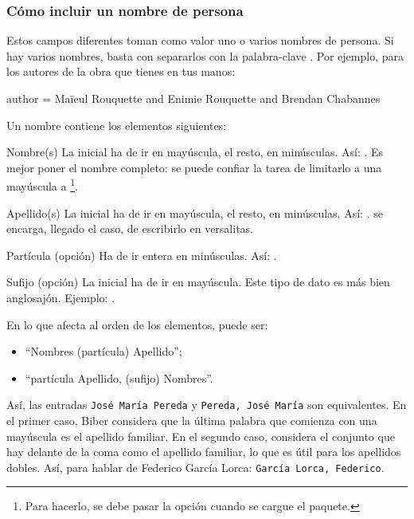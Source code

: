 \subsubsection{Cómo incluir un nombre de persona}

Estos campos diferentes toman como valor uno o varios nombres de
persona. Si hay varios nombres, basta con separarlos con la
palabra-clave . Por ejemplo, para los autores de la obra
que tienes en tus manos:

\begin{latexcode}
author = {Maïeul Rouquette and Enimie Rouquette and Brendan Chabannes}
\end{latexcode}

Un nombre contiene los elementos siguientes:
\begin{choix}
	\item[Nombre(s)]La inicial ha de ir en mayúscula, el resto, en
          minúsculas. Así: . Es mejor poner el nombre
          completo: se puede confiar la tarea de limitarlo a una
          mayúscula a \footnote{Para hacerlo, se
            debe pasar la opción  cuando se
            cargue el paquete.}.
	\item[Apellido(s)]La inicial ha de ir en mayúscula, el resto,
          en minúsculas. Así:
          .  se encarga,
          llegado el caso, de escribirlo en versalitas.
	\item[Partícula (opción)]Ha de ir entera en minúsculas. Así: .
	\item[Sufijo (opción)]La inicial ha de ir en mayúscula. Este
          tipo de dato es más bien anglosajón. Ejemplo: .
\end{choix}


En lo que afecta al orden de los elementos, puede ser:
\begin{itemize}
\item\enquote{Nombres  (partícula)  Apellido};
\item\enquote{partícula Apellido, (sufijo) Nombres}.
\end{itemize}

Así, las entradas \verb|José María Pereda| y
\verb|Pereda, José María| son equivalentes.  En el primer caso,
Biber considera que la última palabra que comienza con una mayúscula
es el apellido familiar. En el segundo caso, considera el conjunto que
hay delante de la coma como el apellido familiar, lo que es útil para
los apellidos dobles. Así, para hablar de Federico García Lorca:
\verb|García Lorca, Federico|.

